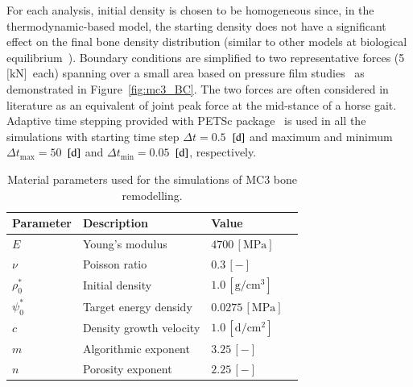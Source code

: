 \documentclass[11pt]{acmeArticle}
\numberwithin{equation}{section}
\begin{document}
For each analysis, initial density is chosen to be homogeneous since, in the thermodynamic-based model, the starting density does not have a significant effect on the final bone density distribution (similar to other models at biological equilibrium~\citep{kuhl2003theory}). %
Boundary conditions are simplified to two representative forces (5~$\text{[kN]}$~each) spanning over a small area based on pressure film studies~\citep{Brama2001} as demonstrated in Figure~\ref{fig:mc3_BC}. 
The two forces are often considered in literature as an equivalent of joint peak force at the mid-stance of a horse gait. %
Adaptive time stepping provided with PETSc package~\citep{petsc-web} is used in all the simulations with starting time step $\Delta t = 0.5$~$[\text d]$ and maximum and minimum $\Delta t_{\text {max}} = 50$~$[\text d]$ and $\Delta t_{\text {min}} = 0.05$~$[\text d]$, respectively.
\begin{table}[h]
	\centering
	\begin{tabular}{lll}
		\hline
		Parameter             & Description                  & Value  \\ \hline
		$E  $                 & Young's modulus              & $4700 \,\mathrm{ [MPa]}$ ~\citep{Les1994} \\
		$\nu  $               & Poisson ratio                & $0.3 \,\mathrm{ [-]}$ \\
		$\rho_0 ^\ast  $      & Initial density              & $1.0 \,\mathrm{[ g/cm^{3}]}$  \\
		$\psi_{0}^\ast $      & Target energy densidy        & $0.0275\,\mathrm{ [MPa]}$  ~\citep{Waffenschmidt2012}  \\
		$c$                   & Density growth velocity      & $1.0 \,\mathrm{ [d/cm^{2}]}$   \\
		$m$                   & Algorithmic exponent         & $ 3.25 \,\mathrm{ [-]}$          \\
		$n$                   & Porosity exponent            & $2.25 \,\mathrm{ [-]}$     ~\citep{Les1994}   \\ 
		\hline
	\end{tabular} 
	\caption{Material parameters used for the simulations of MC3 bone remodelling.}
	\label{tab:parameters_mc3}
\end{table}
\end{document}
